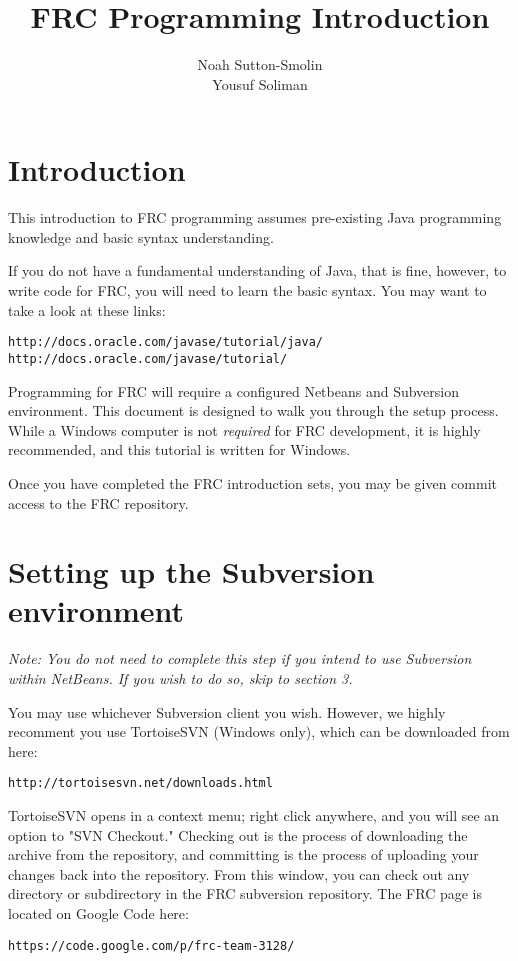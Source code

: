 \documentclass[a4paper]{article}
\title{FRC Programming Introduction}
\author{Noah Sutton-Smolin\\Yousuf Soliman}
\begin{document}
\maketitle

\section{Introduction}

This introduction to FRC programming assumes pre-existing Java programming knowledge and basic syntax understanding.

If you do not have a fundamental understanding of Java, that is fine, however, to write code for FRC, you will need to learn the basic syntax. You may want to take a look at these links:

\begin{verbatim}http://docs.oracle.com/javase/tutorial/java/
http://docs.oracle.com/javase/tutorial/\end{verbatim}

Programming for FRC will require a configured Netbeans and Subversion environment. This document is designed to walk you through the setup process. While a Windows computer is not \textit{required} for FRC development, it is highly recommended, and this tutorial is written for Windows.

Once you have completed the FRC introduction sets, you may be given commit access to the FRC repository.

\section{Setting up the Subversion environment}

\textit{Note: You do not need to complete this step if you intend to use Subversion within NetBeans. If you wish to do so, skip to section 3.}\newline

You may use whichever Subversion client you wish. However, we highly recomment you use TortoiseSVN (Windows only), which can be downloaded from here: \begin{verbatim}http://tortoisesvn.net/downloads.html\end{verbatim}

TortoiseSVN opens in a context menu; right click anywhere, and you will see an option to "SVN Checkout." Checking out is the process of downloading the archive from the repository, and committing is the process of uploading your changes back into the repository. From this window, you can check out any directory or subdirectory in the FRC subversion repository. The FRC page is located on Google Code here:\begin{verbatim}https://code.google.com/p/frc-team-3128/\end{verbatim}
\end{document}
